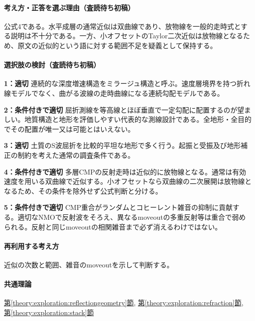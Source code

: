\paragraph{考え方・正答を選ぶ理由（査読待ち初稿）} 公式4である。水平成層の通常近似は双曲線であり、放物線を一般的走時式とする説明は不十分である。一方、小オフセットのTaylor二次近似は放物線となるため、原文の近似的という語に対する範囲不足を疑義として保持する。

\paragraph{選択肢の検討（査読待ち初稿）}\mbox{}\par

\noindent\textbf{1：適切} 連続的な深度増速構造をミラージュ構造と呼ぶ。速度層境界を持つ折れ線モデルでなく、曲がる波線の走時曲線になる連続勾配モデルである。\par

\noindent\textbf{2：条件付きで適切} 屈折測線を等高線とほぼ垂直で一定勾配に配置するのが望ましい。地質構造と地形を評価しやすい代表的な測線設計である。全地形・全目的でその配置が唯一又は可能とはいえない。\par

\noindent\textbf{3：適切} 土質のS波屈折を比較的平坦な地形で多く行う。起振と受振及び地形補正の制約を考えた通常の調査条件である。\par

\noindent\textbf{4：条件付きで適切} 多層CMPの反射走時は近似的に放物線となる。通常は有効速度を用いる双曲線で近似する。小オフセットなら双曲線の二次展開は放物線となるため、その条件を除外せず公式判断と分ける。\par

\noindent\textbf{5：条件付きで適切} CMP重合がランダムとコヒーレント雑音の抑制に貢献する。適切なNMOで反射波をそろえ、異なるmoveoutの多重反射等は重合で弱められる。反射と同じmoveoutの相関雑音まで必ず消えるわけではない。\par

\paragraph{再利用する考え方} 近似の次数と範囲、雑音のmoveoutを示して判断する。

\paragraph{共通理論} \hyperref[theory:exploration:reflectiongeometry]{第\ref*{theory:exploration:reflectiongeometry}節}, \hyperref[theory:exploration:refraction]{第\ref*{theory:exploration:refraction}節}, \hyperref[theory:exploration:stack]{第\ref*{theory:exploration:stack}節}

